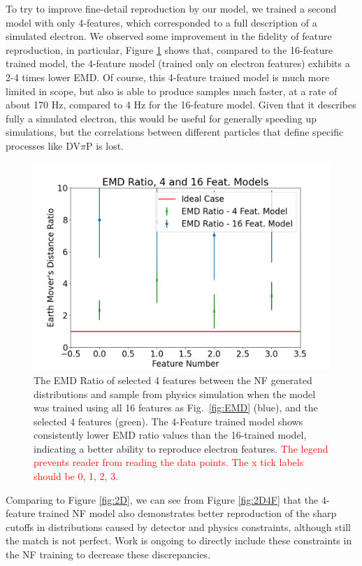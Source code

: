To try to improve fine-detail reproduction by our model, we trained a second model with only 4-features, which corresponded to a full description of a simulated electron. We observed some improvement in the fidelity of feature reproduction, in particular, Figure \ref{fig:EMD2} shows that, compared to the 16-feature trained model, the 4-feature model (trained only on electron features) exhibits a 2-4 times lower EMD. Of course, this 4-feature trained model is much more limited in scope, but also is able to produce samples much faster, at a rate of about 170 Hz, compared to 4 Hz for the 16-feature model. Given that it describes fully a simulated electron, this would be useful for generally speeding up simulations, but the correlations between different particles that define specific processes like DV$\pi$P is lost. 


\begin{figure}[htb]
    \centering
    \includegraphics[width=.47\textwidth,trim={ 0 0 0 0},clip]{Chapters/Ch3-Simulations/normalizing_flows/pics/FinalPictures/EMD/emdratio416.png}
    \caption[Placeholder Short text]{The EMD Ratio of selected 4 features between the NF generated distributions and sample from physics simulation when the model was trained using all 16 features as Fig.~\ref{fig:EMD} (blue), and the selected 4 features (green). The 4-Feature trained model shows consistently lower EMD ratio values than the 16-trained model, indicating a better ability to reproduce electron features. \textcolor{red}{The legend prevents reader from reading the data points. The x tick labels should be 0, 1, 2, 3.}}
    \label{fig:EMD2}
\end{figure}

Comparing to Figure \ref{fig:2D}, we can see from Figure \ref{fig:2D4F} that the 4-feature trained NF model also demonstrates better reproduction of the sharp cutoffs in distributions caused by detector and physics constraints, although still the match is not perfect. Work is ongoing to directly include these constraints in the NF training to decrease these discrepancies.

